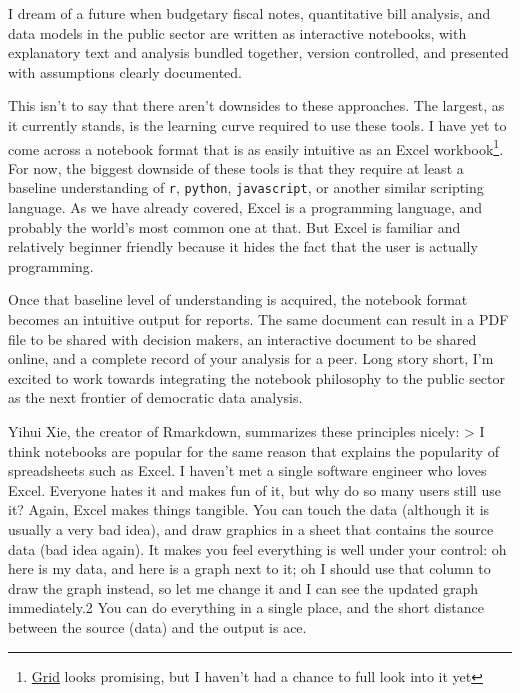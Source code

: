 \documentclass[]{book}
\begin{document}
I dream of a future when budgetary fiscal notes, quantitative bill analysis, and data models in the public sector are written as interactive notebooks, with explanatory text and analysis bundled together, version controlled, and presented with assumptions clearly documented.

This isn't to say that there aren't downsides to these approaches. The largest, as it currently stands, is the learning curve required to use these tools. I have yet to come across a notebook format that is as easily intuitive as an Excel workbook\footnote{\href{https://beta.grid.is/@grid/what-is-grid-yBYeOyirSSKBlknj25F98A}{Grid} looks promising, but I haven't had a chance to full look into it yet}. For now, the biggest downside of these tools is that they require at least a baseline understanding of \texttt{r}, \texttt{python}, \texttt{javascript}, or another similar scripting language. As we have already covered, Excel is a programming language, and probably the world's most common one at that. But Excel is familiar and relatively beginner friendly because it hides the fact that the user is actually programming.

Once that baseline level of understanding is acquired, the notebook format becomes an intuitive output for reports. The same document can result in a PDF file to be shared with decision makers, an interactive document to be shared online, and a complete record of your analysis for a peer. Long story short, I'm excited to work towards integrating the notebook philosophy to the public sector as the next frontier of democratic data analysis.

Yihui Xie, the creator of Rmarkdown, summarizes these principles nicely:
\textgreater{} I think notebooks are popular for the same reason that explains the popularity of spreadsheets such as Excel. I haven't met a single software engineer who loves Excel. Everyone hates it and makes fun of it, but why do so many users still use it? Again, Excel makes things tangible. You can touch the data (although it is usually a very bad idea), and draw graphics in a sheet that contains the source data (bad idea again). It makes you feel everything is well under your control: oh here is my data, and here is a graph next to it; oh I should use that column to draw the graph instead, so let me change it and I can see the updated graph immediately.2 You can do everything in a single place, and the short distance between the source (data) and the output is ace.
\end{document}
